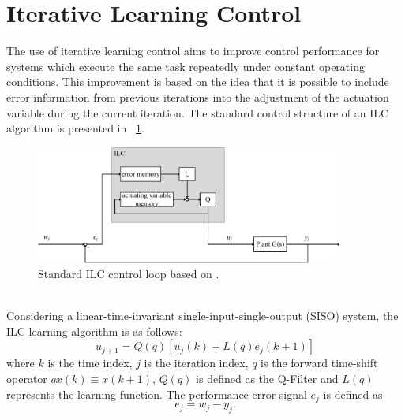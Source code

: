 \section{Iterative Learning Control}\label{ILC}
The use of iterative learning control aims to improve control performance for systems which execute the same task repeatedly under constant operating conditions. This improvement is based on the idea that it is possible to include error information from previous iterations into the adjustment of the actuation variable during the current iteration.
The standard control structure of an ILC algorithm is presented in \figurename~\ref{fig:ILC_only}.
\begin{figure}[h]
   \centering
   \includegraphics[width=0.9\textwidth]{images/chapt_3/ILC_only.pdf}
   \caption[Standard ILC control loop]{Standard ILC control loop based on \cite{ILC2}.}
   \label{fig:ILC_only}
 \end{figure}
\\Considering a linear-time-invariant single-input-single-output (SISO) system, the ILC learning algorithm is as follows:
\begin{equation}
    u_{j+1}  = Q(q)[u_{j}(k)+L(q)e_{j}(k+1)]
 \label{eq:ILC_standard}
\end{equation}
where $k$ is the time index, $j$ is the iteration index, $q$ is the forward time-shift operator $qx(k) \equiv x(k + 1)$, $Q(q)$ is defined as the Q-Filter and $L(q)$ represents the learning function. The performance error signal $e_{j}$ is defined as
\begin{equation}
    e_{j}  = w_{j}-y_{j}.
 \label{eq:perf_error}
\end{equation}

